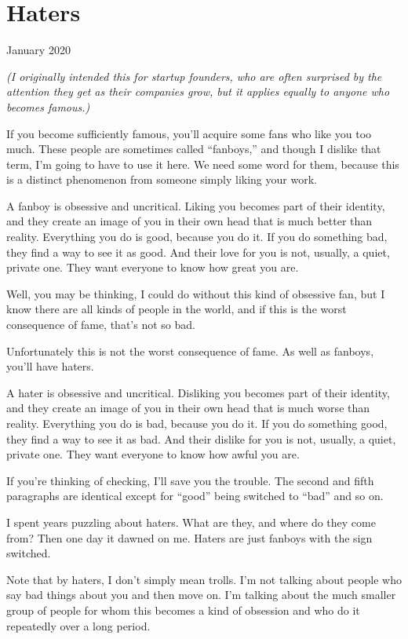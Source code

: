 \chapter{Haters}

January 2020

\emph{(I originally intended this for startup founders, who are often
surprised by the attention they get as their companies grow, but it
applies equally to anyone who becomes famous.)}

If you become sufficiently famous, you'll acquire some fans who like you
too much. These people are sometimes called ``fanboys,'' and though I
dislike that term, I'm going to have to use it here. We need some word
for them, because this is a distinct phenomenon from someone simply
liking your work.

A fanboy is obsessive and uncritical. Liking you becomes part of their
identity, and they create an image of you in their own head that is much
better than reality. Everything you do is good, because you do it. If
you do something bad, they find a way to see it as good. And their love
for you is not, usually, a quiet, private one. They want everyone to
know how great you are.

Well, you may be thinking, I could do without this kind of obsessive
fan, but I know there are all kinds of people in the world, and if this
is the worst consequence of fame, that's not so bad.

Unfortunately this is not the worst consequence of fame. As well as
fanboys, you'll have haters.

A hater is obsessive and uncritical. Disliking you becomes part of their
identity, and they create an image of you in their own head that is much
worse than reality. Everything you do is bad, because you do it. If you
do something good, they find a way to see it as bad. And their dislike
for you is not, usually, a quiet, private one. They want everyone to
know how awful you are.

If you're thinking of checking, I'll save you the trouble. The second
and fifth paragraphs are identical except for ``good'' being switched to
``bad'' and so on.

I spent years puzzling about haters. What are they, and where do they
come from? Then one day it dawned on me. Haters are just fanboys with
the sign switched.

Note that by haters, I don't simply mean trolls. I'm not talking about
people who say bad things about you and then move on. I'm talking about
the much smaller group of people for whom this becomes a kind of
obsession and who do it repeatedly over a long period.

